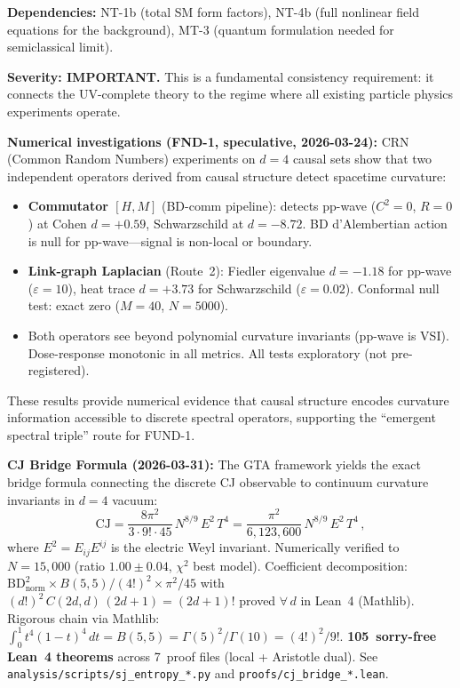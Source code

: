 \documentclass[12pt,a4paper]{article}
\newcommand{\deps}[1]{\noindent\textbf{Dependencies:} #1\par}
\begin{document}
\deps{NT-1b (total SM form factors), NT-4b (full nonlinear field equations for
the background), MT-3 (quantum formulation needed for semiclassical limit).}

\textbf{Severity: IMPORTANT.} This is a fundamental consistency requirement:
it connects the UV-complete theory to the regime where all existing particle
physics experiments operate.

\textbf{Numerical investigations (FND-1, speculative, 2026-03-24):}
CRN (Common Random Numbers) experiments on $d{=}4$ causal sets show that two
independent operators derived from causal structure detect spacetime curvature:
\begin{itemize}
  \item \textbf{Commutator $[H,M]$} (BD-comm pipeline): detects pp-wave ($C^2{=}0$,
    $R{=}0$) at Cohen $d{=}{+}0.59$, Schwarzschild at $d{=}{-}8.72$.
    BD d'Alembertian action is null for pp-wave---signal is non-local or boundary.
  \item \textbf{Link-graph Laplacian} (Route~2): Fiedler eigenvalue $d{=}{-}1.18$
    for pp-wave ($\varepsilon{=}10$), heat trace $d{=}{+}3.73$ for Schwarzschild
    ($\varepsilon{=}0.02$). Conformal null test: exact zero ($M{=}40$, $N{=}5000$).
  \item Both operators see beyond polynomial curvature invariants (pp-wave is VSI).
    Dose-response monotonic in all metrics. All tests exploratory (not pre-registered).
\end{itemize}
These results provide numerical evidence that causal structure encodes curvature
information accessible to discrete spectral operators, supporting the
``emergent spectral triple'' route for FUND-1.

\textbf{CJ Bridge Formula (2026-03-31):}
The GTA framework yields the exact bridge formula connecting the discrete CJ observable
to continuum curvature invariants in $d{=}4$ vacuum:
\[
  \mathrm{CJ} = \frac{8\pi^2}{3\cdot 9!\cdot 45}\, N^{8/9}\, E^2\, T^4
  = \frac{\pi^2}{6{,}123{,}600}\, N^{8/9}\, E^2\, T^4\,,
\]
where $E^2 = E_{ij}E^{ij}$ is the electric Weyl invariant.
Numerically verified to $N{=}15{,}000$ (ratio $1.00\pm 0.04$, $\chi^2$ best model).
Coefficient decomposition: $\mathrm{BD}_{\mathrm{norm}}^2 \times B(5,5)/(4!)^2 \times \pi^2/45$
with $(d!)^2\, C(2d,d)\, (2d{+}1) = (2d{+}1)!$ proved $\forall\, d$ in Lean~4 (Mathlib).
Rigorous chain via Mathlib: $\int_0^1 t^4(1{-}t)^4\,dt = B(5,5)
= \Gamma(5)^2/\Gamma(10) = (4!)^2/9!$.
\textbf{105~sorry-free Lean~4 theorems} across 7~proof files (local + Aristotle dual).
See \texttt{analysis/scripts/sj\_entropy\_*.py} and \texttt{proofs/cj\_bridge\_*.lean}.
\end{document}
